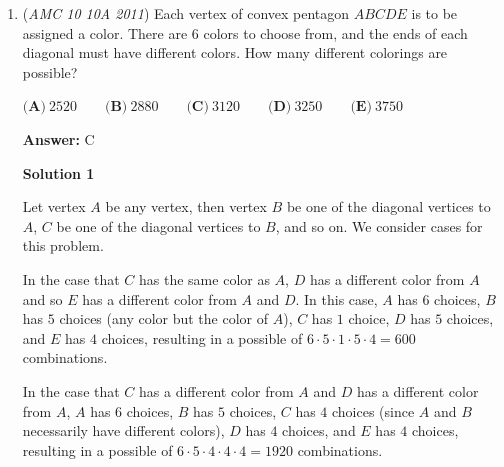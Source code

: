 \begin{enumerate}
\textbf{Solution 4}

We start by caluclating the probability that we draw 2 pairs with equivalent weight. There are 2 ways this can be done. The first way is the we draw 2 pairs consisting of one counterfeit coin and one genuine coin. The probability of this is $\frac{8}{10} \cdot \frac{2}{9} \cdot \frac{7}{8} \cdot \frac{1}{7} \cdot 4 = \frac{4}{45}$. We multiply by 4 because we can draw each pair in 2 ways, fake then real or vice versa. The other way we can draw 2 pairs with equivalent weight is by drawing 4 real coins. There is only one order in which this can be done (Make sure you understand why). We get $\frac{8}{10} \cdot \frac{7}{9} \cdot \frac{6}{8} \cdot \frac{5}{7} = \frac{1}{3}$ We also just found the numerator of the fraction, $\frac{1}{3}$ because the question asks what the probability that all $4$ selected coins are genuine is. Therefore, our final fraction is $\frac{\frac{1}{3}}{\frac{4}{45} + \frac{1}{3}}$ which equals $\boxed{\frac{15}{19} \ \mathbf{(D)}}$.

 -litttle\_master

 


 \textbf{Manim} 


	\item (\textit{AMC 10 10A 2011}) Each vertex of convex pentagon $ABCDE$ is to be assigned a color. There are $6$ colors to choose from, and the ends of each diagonal must have different colors. How many different colorings are possible?


 $\textbf{(A)}\ 2520\qquad\textbf{(B)}\ 2880\qquad\textbf{(C)}\ 3120\qquad\textbf{(D)}\ 3250\qquad\textbf{(E)}\ 3750$

 \textbf{Answer: }C



\textbf{Solution 1}

Let vertex $A$ be any vertex, then vertex $B$ be one of the diagonal vertices to $A$, $C$ be one of the diagonal vertices to $B$, and so on. We consider cases for this problem.

 In the case that $C$ has the same color as $A$, $D$ has a different color from $A$ and so $E$ has a different color from $A$ and $D$. In this case, $A$ has $6$ choices, $B$ has $5$ choices (any color but the color of $A$), $C$ has $1$ choice, $D$ has $5$ choices, and $E$ has $4$ choices, resulting in a possible of $6 \cdot 5 \cdot 1 \cdot 5 \cdot 4 = 600$ combinations.

 In the case that $C$ has a different color from $A$ and $D$ has a different color from $A$, $A$ has $6$ choices, $B$ has $5$ choices, $C$ has $4$ choices (since $A$ and $B$ necessarily have different colors), $D$ has $4$ choices, and $E$ has $4$ choices, resulting in a possible of $6 \cdot 5 \cdot 4 \cdot 4 \cdot 4 = 1920$ combinations.


\end{enumerate}
